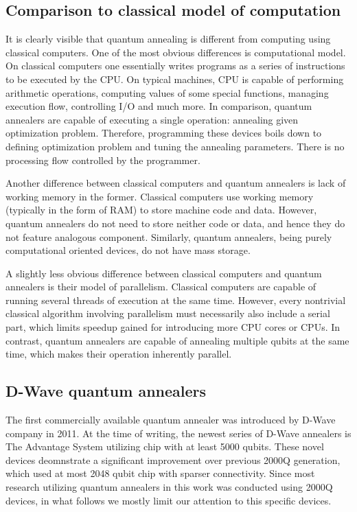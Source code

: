 \subsection{Comparison to classical model of computation}
It is clearly visible that quantum annealing is different from computing using classical computers. One of the most obvious differences is computational model. On classical computers one essentially writes programs as a series of instructions to be executed by the CPU. On typical machines, CPU is capable of performing arithmetic operations, computing values of some special functions, managing execution flow, controlling I/O and much more. In comparison, quantum annealers are capable of executing a single operation: annealing given optimization problem. Therefore, programming these devices boils down to defining optimization problem and tuning the annealing parameters. There is no processing flow controlled by the programmer.

Another difference between classical computers and quantum annealers is lack of working memory in the former. Classical computers use working memory (typically in the form of RAM) to store machine code and data. However, quantum annealers do not need to store neither code or data, and hence they do not feature analogous component. Similarly, quantum annealers, being purely computational oriented devices, do not have mass storage.

A slightly less obvious difference between classical computers and quantum annealers is their model of parallelism. Classical computers are capable of running several threads of execution at the same time. However, every nontrivial classical algorithm involving parallelism must necessarily also include a serial part, which limits speedup gained for introducing more CPU cores or CPUs. In contrast, quantum annealers are capable of annealing multiple qubits at the same time, which makes their operation inherently parallel.

\subsection{D-Wave quantum annealers}

The first commercially available quantum annealer was introduced by D-Wave company in 2011. At the time of writing, the newest series of D-Wave annealers is The Advantage System utilizing chip with at least 5000 qubits. These novel devices deomnstrate a significant improvement over previous 2000Q generation, which used at most 2048 qubit chip with sparser connectivity. Since most research utilizing quantum annealers in this work was conducted using 2000Q devices, in what follows we mostly limit our attention to this specific devices.

